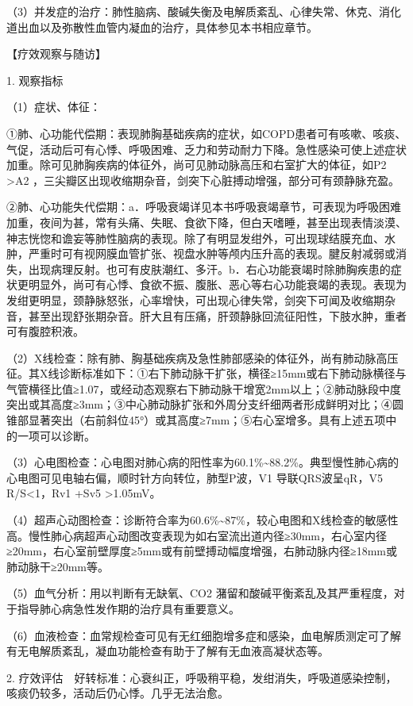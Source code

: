 （3）并发症的治疗：肺性脑病、酸碱失衡及电解质紊乱、心律失常、休克、消化道出血以及弥散性血管内凝血的治疗，具体参见本书相应章节。

【疗效观察与随访】

1. 观察指标

（1）症状、体征：

①肺、心功能代偿期：表现肺胸基础疾病的症状，如COPD患者可有咳嗽、咳痰、气促，活动后可有心悸、呼吸困难、乏力和劳动耐力下降。急性感染可使上述症状加重。除可见肺胸疾病的体征外，尚可见肺动脉高压和右室扩大的体征，如P{2}
\textgreater{}A{2}
，三尖瓣区出现收缩期杂音，剑突下心脏搏动增强，部分可有颈静脉充盈。

②肺、心功能失代偿期：a．呼吸衰竭详见本书呼吸衰竭章节，可表现为呼吸困难加重，夜间为甚，常有头痛、失眠、食欲下降，但白天嗜睡，甚至出现表情淡漠、神志恍惚和谵妄等肺性脑病的表现。除了有明显发绀外，可出现球结膜充血、水肿，严重时可有视网膜血管扩张、视盘水肿等颅内压升高的表现。腱反射减弱或消失，出现病理反射。也可有皮肤潮红、多汗。b．右心功能衰竭时除肺胸疾患的症状更明显外，尚可有心悸、食欲不振、腹胀、恶心等右心功能衰竭的表现。表现为发绀更明显，颈静脉怒张，心率增快，可出现心律失常，剑突下可闻及收缩期杂音，甚至出现舒张期杂音。肝大且有压痛，肝颈静脉回流征阳性，下肢水肿，重者可有腹腔积液。

（2）X线检查：除有肺、胸基础疾病及急性肺部感染的体征外，尚有肺动脉高压征。其X线诊断标准如下：①右下肺动脉干扩张，横径≥15mm或右下肺动脉横径与气管横径比值≥1.07，或经动态观察右下肺动脉干增宽2mm以上；②肺动脉段中度突出或其高度≥3mm；③中心肺动脉扩张和外周分支纤细两者形成鲜明对比；④圆锥部显著突出（右前斜位45°）或其高度≥7mm；⑤右心室增多。具有上述五项中的一项可以诊断。

（3）心电图检查：心电图对肺心病的阳性率为60.1\%\textasciitilde{}88.2\%。典型慢性肺心病的心电图可见电轴右偏，顺时针方向转位，肺型P波，V{1}
导联QRS波呈qR，V{5} R/S\textless{}1，R{v1} +S{v5} \textgreater{}1.05mV。

（4）超声心动图检查：诊断符合率为60.6\%\textasciitilde{}87\%，较心电图和X线检查的敏感性高。慢性肺心病超声心动图改变表现为如右室流出道内径≥30mm，右心室内径≥20mm，右心室前壁厚度≥5mm或有前壁搏动幅度增强，右肺动脉内径≥18mm或肺动脉干≥20mm等。

（5）血气分析：用以判断有无缺氧、CO{2}
潴留和酸碱平衡紊乱及其严重程度，对于指导肺心病急性发作期的治疗具有重要意义。

（6）血液检查：血常规检查可见有无红细胞增多症和感染，血电解质测定可了解有无电解质紊乱，凝血功能检查有助于了解有无血液高凝状态等。

2.
疗效评估　好转标准：心衰纠正，呼吸稍平稳，发绀消失，呼吸道感染控制，咳痰仍较多，活动后仍心悸。几乎无法治愈。

